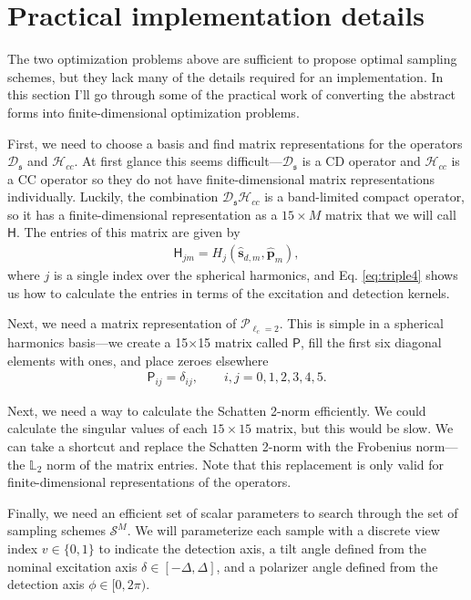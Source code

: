 \documentclass[11pt]{article}
\providecommand{\mc}[1]{\mathcal{#1}}
\providecommand{\mh}[1]{\mathbf{\hat{#1}}}
\providecommand{\mf}[1]{\mathfrak{#1}}
\providecommand{\ms}[1]{\mathsf{#1}}
\providecommand{\mbb}[1]{\mathbb{#1}}
\begin{document}
\section{Practical implementation details}
The two optimization problems above are sufficient to propose optimal sampling
schemes, but they lack many of the details required for an implementation. In
this section I'll go through some of the practical work of converting the
abstract forms into finite-dimensional optimization problems.

First, we need to choose a basis and find matrix representations for the
operators $\mc{D}_{\mf{s}}$ and $\mc{H}_{cc}$. At first glance this seems
difficult---$\mc{D}_{\mf{s}}$ is a CD operator and $\mc{H}_{cc}$ is a CC
operator so they do not have finite-dimensional matrix representations
individually. Luckily, the combination $\mc{D}_{\mf{s}} \mc{H}_{cc}$ is a
band-limited compact operator, so it has a finite-dimensional representation as
a $15\times M$ matrix that we will call $\ms{H}$. The entries of this matrix are
given by
\begin{align}
  \ms{H}_{jm} = H_j(\mh{s}_{d,m}, \mh{p}_m),
\end{align}
where $j$ is a single index over the spherical harmonics, and Eq.
\ref{eq:triple4} shows us how to calculate the entries in terms
of the excitation and detection kernels. 

Next, we need a matrix representation of $\mc{P}_{\ell_c=2}$. This is simple in
a spherical harmonics basis---we create a 15$\times$15 matrix called
$\ms{P}$, fill the first six diagonal elements with ones, and place zeroes
elsewhere
\begin{align}
  \ms{P}_{ij} = \delta_{ij}, \qquad i,j = 0,1,2,3,4,5.
\end{align}

Next, we need a way to calculate the Schatten 2-norm efficiently. We could
calculate the singular values of each $15\times 15$ matrix, but this would be
slow. We can take a shortcut and replace the Schatten 2-norm with the Frobenius
norm---the $\mbb{L}_2$ norm of the matrix entries. Note that this replacement is
only valid for finite-dimensional representations of the operators.

Finally, we need an efficient set of scalar parameters to search through the set
of sampling schemes $\mc{S}^M$. We will parameterize each sample with a discrete
view index $v \in \{0, 1\}$ to indicate the detection axis, a tilt angle defined
from the nominal excitation axis $\delta \in [-\Delta, \Delta]$, and a polarizer
angle defined from the detection axis $\phi \in [0, 2\pi)$.
\end{document}
